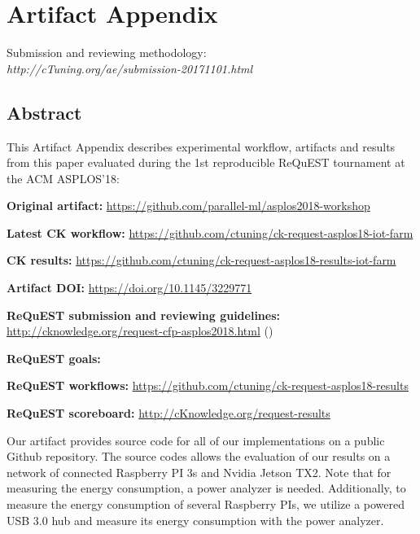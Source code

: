 \documentclass[sigplan]{acmart}
\newenvironment{packed_itemize}{
\begin{itemize}
  \setlength{\itemsep}{1pt}
  \setlength{\parskip}{0pt}
  \setlength{\parsep}{0pt}
}{\end{itemize}}
\begin{document}
\newpage

\onecolumn

\appendix
\section{Artifact Appendix}

Submission and reviewing methodology: \\
{\em http://cTuning.org/ae/submission-20171101.html}

\subsection{Abstract}

This Artifact Appendix describes experimental workflow,
artifacts and results from this paper evaluated 
during the 1st reproducible ReQuEST tournament at the ACM ASPLOS'18:

\begin{packed_itemize}
  \item {\bf Original artifact:} \url{https://github.com/parallel-ml/asplos2018-workshop}
  \item {\bf Latest CK workflow:} \url{https://github.com/ctuning/ck-request-asplos18-iot-farm}
  \item {\bf CK results:} \url{https://github.com/ctuning/ck-request-asplos18-results-iot-farm}
  \item {\bf Artifact DOI:} \url{https://doi.org/10.1145/3229771}
  \item {\bf ReQuEST submission and reviewing guidelines:} \url{http://cknowledge.org/request-cfp-asplos2018.html} (\cite{request-asplos18})
  \item {\bf ReQuEST goals:} \cite{cm:29db2248aba45e59:0c7348dfbadd5b95}
  \item {\bf ReQuEST workflows:} \url{https://github.com/ctuning/ck-request-asplos18-results}
  \item {\bf ReQuEST scoreboard:} \url{http://cKnowledge.org/request-results}
\end{packed_itemize}

Our artifact provides source code for all of our
implementations on a public Github repository. The source
codes allows the evaluation of our results on a network
of connected Raspberry PI 3s and Nvidia Jetson TX2. Note that
for measuring the energy consumption, a power analyzer
is needed. Additionally, to measure the energy consumption
of several Raspberry PIs, we utilize a powered USB 3.0 hub and
measure its energy consumption with the power analyzer.
\end{document}
